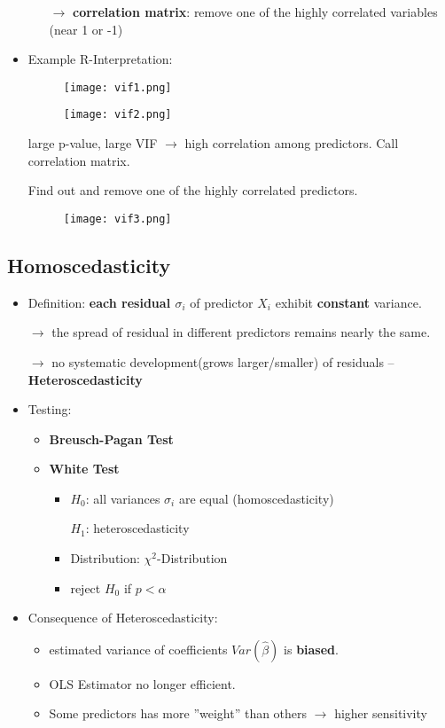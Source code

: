 \begin{itemize}
\begin{itemize}
		$\rightarrow$ \textbf{correlation matrix}: remove one of the highly correlated variables (near 1 or -1)
	\end{itemize}

	\item Example R-Interpretation: 
	\begin{figure}[H]
		\centering
		\texttt{[image: vif1.png]}
	\end{figure}
	\begin{figure}[H]
		\centering
		\texttt{[image: vif2.png]}
	\end{figure}
	large p-value, large VIF $\rightarrow$ high correlation among predictors. Call correlation matrix.
	
	Find out and remove one of the highly correlated predictors.
	\begin{figure}[H]
		\centering
		\texttt{[image: vif3.png]}
	\end{figure}
\end{itemize}

\subsection{Homoscedasticity}
\begin{itemize}
	\item Definition: \textbf{each residual $\sigma_i$} of predictor $X_i$ exhibit \textbf{constant} variance.
	
	$\rightarrow$ the spread of residual in different predictors remains nearly the same. 
	
	$\rightarrow$ no systematic development(grows larger/smaller) of residuals -- \textbf{Heteroscedasticity}
	
	\item Testing: 
	\begin{itemize}
		\item \textbf{Breusch-Pagan Test}
		\item \textbf{White Test}
		\begin{itemize}
			\item $H_0$: all variances $\sigma_i$ are equal (homoscedasticity)
			
			$H_1$: heteroscedasticity
			\item Distribution: $\chi^2$-Distribution
			\item reject $H_0$ if $p < \alpha$ 
		\end{itemize}
	\end{itemize}

	\item Consequence of Heteroscedasticity:
	\begin{itemize}
		\item estimated variance of coefficients $Var(\hat{\beta})$ is \textbf{biased}.
		\item OLS Estimator no longer efficient.
		\item Some predictors has more ''weight'' than others $\rightarrow$ higher sensitivity
	\end{itemize}
\end{itemize}

